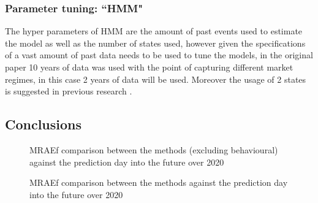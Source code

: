 
\subsubsection{Parameter tuning: ``HMM"}
The hyper parameters of \ac{HMM} are the amount of past events used to estimate the model as well as the number of states used, however given the specifications of \cite{MultiPeriod_PO_mpc} a vast amount of past data needs to be used to tune the models, in the original paper 10 years of data was used with the point of capturing different market regimes, in this case 2 years of data will be used. Moreover the usage of 2 states is suggested in previous research \cite{MultiPeriod_PO_mpc}.

\subsection{Conclusions}


\begin{figure}[ht!]
    \centering
    
    \caption{MRAEf comparison between the methods (excluding behavioural) against the prediction day into the future over 2020}
    \label{fig:comparisonOnlyMu}
\end{figure}


\begin{figure}[ht!]
    \centering
    
    \caption{MRAEf comparison between the methods against the prediction day into the future over 2020}
    \label{fig:comparisonOnlyMu2}
\end{figure}

